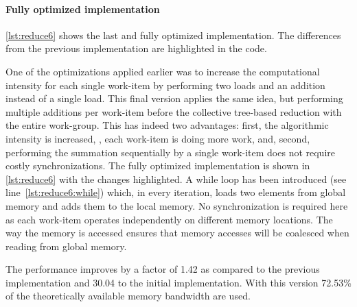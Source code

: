\paragraph{Fully optimized implementation}

\autoref{lst:reduce6} shows the last and fully optimized implementation.
The differences from the previous implementation are highlighted in the code.

One of the optimizations applied earlier was to increase the computational intensity for each single work-item by performing two loads and an addition instead of a single load.
This final version applies the same idea, but performing multiple additions per work-item before the collective tree-based reduction with the entire work-group.
This has indeed two advantages:
first, the algorithmic intensity is increased, \ie, each work-item is doing more work,
and, second, performing the summation sequentially by a single work-item does not require costly synchronizations.
The fully optimized implementation is shown in \autoref{lst:reduce6} with the changes highlighted.
A while loop has been introduced (see line~\ref{lst:reduce6:while}) which, in every iteration, loads two elements from global memory and adds them to the local memory.
No synchronization is required here as each work-item operates independently on different memory locations.
The way the memory is accessed ensures that memory accesses will be coalesced when reading from global memory.

The performance improves by a factor of 1.42 as compared to the previous implementation and 30.04 to the initial implementation.
With this version 72.53\% of the theoretically available memory bandwidth are used.

